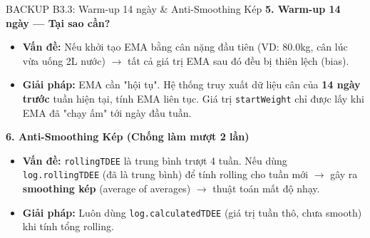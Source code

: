\documentclass[10pt, aspectratio=169]{beamer}
\begin{document}
\begin{frame}[label=b3_3]{BACKUP B3.3: Warm-up 14 ngày \& Anti-Smoothing Kép}
\hypertarget{b3_3_target}{}
    \textbf{5. Warm-up 14 ngày — Tại sao cần?}
    \begin{itemize}
        \small
        \item \textbf{Vấn đề:} Nếu khởi tạo EMA bằng cân nặng đầu tiên (VD: 80.0kg, cân lúc vừa uống 2L nước) $\rightarrow$ tất cả giá trị EMA sau đó đều bị thiên lệch (bias).
        \item \textbf{Giải pháp:} EMA cần "hội tụ". Hệ thống truy xuất dữ liệu cân của \textbf{14 ngày trước} tuần hiện tại, tính EMA liên tục. Giá trị \texttt{startWeight} chỉ được lấy khi EMA đã "chạy ấm" tới ngày đầu tuần.
    \end{itemize}
    
    \vspace{0.3cm}
    \textbf{6. Anti-Smoothing Kép (Chống làm mượt 2 lần)}
    \begin{itemize}
        \small
        \item \textbf{Vấn đề:} \texttt{rollingTDEE} là trung bình trượt 4 tuần. Nếu dùng \texttt{log.rollingTDEE} (đã là trung bình) để tính rolling cho tuần mới $\rightarrow$ gây ra \textbf{smoothing kép} (average of averages) $\rightarrow$ thuật toán mất độ nhạy.
        \item \textbf{Giải pháp:} Luôn dùng \texttt{log.calculatedTDEE} (giá trị tuần thô, chưa smooth) khi tính tổng rolling.
    \end{itemize}
\end{frame}
\end{document}
